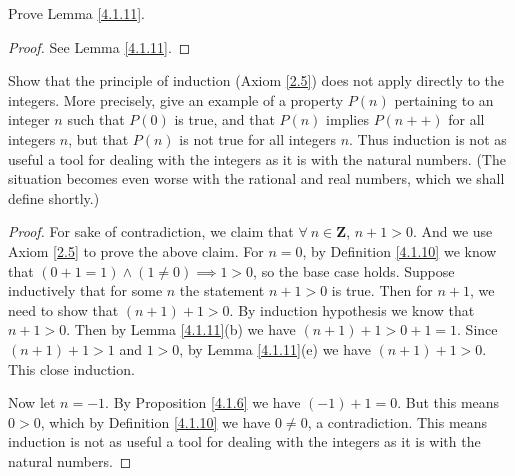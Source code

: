 \begin{exercise}\label{ex 4.1.7}
    Prove Lemma \ref{4.1.11}.
\end{exercise}

\begin{proof}
    See Lemma \ref{4.1.11}.
\end{proof}

\begin{exercise}\label{ex 4.1.8}
    Show that the principle of induction (Axiom \ref{2.5}) does not apply directly to the integers.
    More precisely, give an example of a property \(P(n)\) pertaining to an integer \(n\) such that \(P(0)\) is true, and that \(P(n)\) implies \(P(n++)\) for all integers \(n\), but that \(P(n)\) is not true for all integers \(n\).
    Thus induction is not as useful a tool for dealing with the integers as it is with the natural numbers.
    (The situation becomes even worse with the rational and real numbers, which we shall define shortly.)
\end{exercise}

\begin{proof}
    For sake of contradiction, we claim that \(\forall\ n \in \mathbf{Z}\), \(n + 1 > 0\).
    And we use Axiom \ref{2.5} to prove the above claim.
    For \(n = 0\), by Definition \ref{4.1.10} we know that \((0 + 1 = 1) \land (1 \neq 0) \implies 1 > 0\), so the base case holds.
    Suppose inductively that for some \(n\) the statement \(n + 1 > 0\) is true.
    Then for \(n + 1\), we need to show that \((n + 1) + 1 > 0\).
    By induction hypothesis we know that \(n + 1 > 0\).
    Then by Lemma \ref{4.1.11}(b) we have \((n + 1) + 1 > 0 + 1 = 1\).
    Since \((n + 1) + 1 > 1\) and \(1 > 0\), by Lemma \ref{4.1.11}(e) we have \((n + 1) + 1 > 0\).
    This close induction.

    Now let \(n = -1\).
    By Proposition \ref{4.1.6} we have \((-1) + 1 = 0\).
    But this means \(0 > 0\), which by Definition \ref{4.1.10} we have \(0 \neq 0\), a contradiction.
    This means induction is not as useful a tool for dealing with the integers as it is with the natural numbers.
\end{proof}